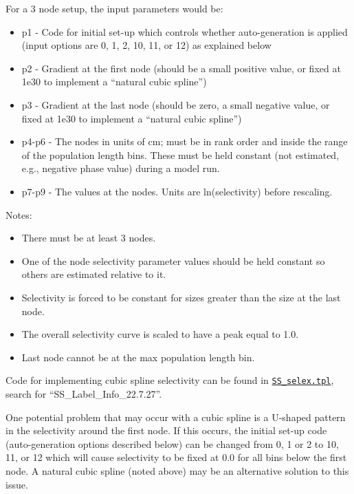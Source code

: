 For a 3 node setup, the input parameters would be:
	\begin{itemize}
		\item p1 - Code for initial set-up which controls whether auto-generation is applied (input options are 0, 1, 2, 10, 11, or 12) as explained below
		\item p2 - Gradient at the first node (should be a small positive value, or fixed at 1e30 to implement a ``natural cubic spline'')
		\item p3 - Gradient at the last node (should be zero, a small negative value, or fixed at 1e30 to implement a ``natural cubic spline'')
		\item p4-p6 - The nodes in units of cm; must be in rank order and inside the range of the population length bins. These must be held constant (not estimated, e.g., negative phase value) during a model run.
		\item p7-p9 - The values at the nodes. Units are ln(selectivity) before rescaling.
	\end{itemize}

Notes:
	\begin{itemize}
		\item There must be at least 3 nodes.
		\item One of the node selectivity parameter values should be held constant so others are estimated relative to it.
		\item Selectivity is forced to be constant for sizes greater than the size at the last node.
		\item The overall selectivity curve is scaled to have a peak equal to 1.0.
		\item Last node cannot be at the max population length bin.
	\end{itemize}
	
Code for implementing cubic spline selectivity can be found in
\href{https://github.com/nmfs-ost/ss3-source-code/blob/main/SS_selex.tpl}{\texttt{SS\_selex.tpl}},
search for ``SS\_Label\_Info\_22.7.27''.

One potential problem that may occur with a cubic spline is a U-shaped pattern in the selectivity around the first node. If this occurs, the initial set-up code (auto-generation options described below) can be changed from 0, 1 or 2 to 10, 11, or 12 which will cause selectivity to be fixed at 0.0 for all bins below the first node. A natural cubic spline (noted above) may be an alternative solution to this issue.

